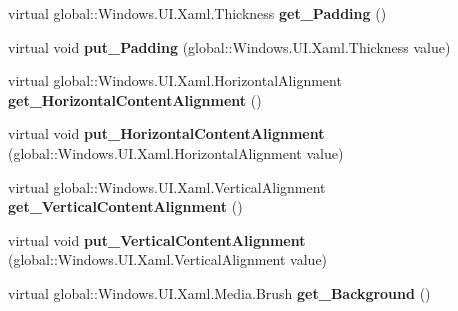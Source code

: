 \begin{DoxyCompactItemize}
\item 
\mbox{\label{class_windows_1_1_u_i_1_1_xaml_1_1_controls_1_1_control_ae5ac1dbce8d9d993ed0c6ef90a22159d}} 
virtual global\+::\+Windows.\+U\+I.\+Xaml.\+Thickness {\bfseries get\+\_\+\+Padding} ()
\item 
\mbox{\label{class_windows_1_1_u_i_1_1_xaml_1_1_controls_1_1_control_a6898d6903b57a058dd5fb8ef28c5ec58}} 
virtual void {\bfseries put\+\_\+\+Padding} (global\+::\+Windows.\+U\+I.\+Xaml.\+Thickness value)
\item 
\mbox{\label{class_windows_1_1_u_i_1_1_xaml_1_1_controls_1_1_control_ab75bd10489d1a9f3060a3d3d8c060dbd}} 
virtual global\+::\+Windows.\+U\+I.\+Xaml.\+Horizontal\+Alignment {\bfseries get\+\_\+\+Horizontal\+Content\+Alignment} ()
\item 
\mbox{\label{class_windows_1_1_u_i_1_1_xaml_1_1_controls_1_1_control_a529faaf72afad384ebe1f02f4b794a09}} 
virtual void {\bfseries put\+\_\+\+Horizontal\+Content\+Alignment} (global\+::\+Windows.\+U\+I.\+Xaml.\+Horizontal\+Alignment value)
\item 
\mbox{\label{class_windows_1_1_u_i_1_1_xaml_1_1_controls_1_1_control_a7006e185e4500ff498f82b3f44fd79fa}} 
virtual global\+::\+Windows.\+U\+I.\+Xaml.\+Vertical\+Alignment {\bfseries get\+\_\+\+Vertical\+Content\+Alignment} ()
\item 
\mbox{\label{class_windows_1_1_u_i_1_1_xaml_1_1_controls_1_1_control_af756ef0a995189ff771e3537a5391b42}} 
virtual void {\bfseries put\+\_\+\+Vertical\+Content\+Alignment} (global\+::\+Windows.\+U\+I.\+Xaml.\+Vertical\+Alignment value)
\item 
\mbox{\label{class_windows_1_1_u_i_1_1_xaml_1_1_controls_1_1_control_a5eb22428eb30c926bcbbdcce65e09678}} 
virtual global\+::\+Windows.\+U\+I.\+Xaml.\+Media.\+Brush {\bfseries get\+\_\+\+Background} ()
\item 

\end{DoxyCompactItemize}
